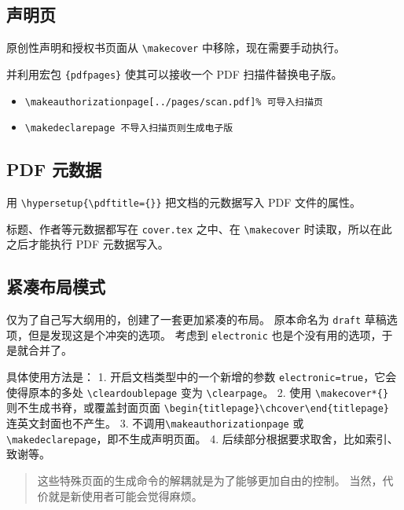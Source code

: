 \documentclass[../Main/thesis.tex]{subfiles}
\begin{document}
\subsection{声明页}

原创性声明和授权书页面从 \texttt{\textbackslash{}makecover}
中移除，现在需要手动执行。

并利用宏包 \texttt{\{pdfpages\}} 使其可以接收一个 PDF 扫描件替换电子版。

\begin{itemize}
\item
  \texttt{\textbackslash{}makeauthorizationpage{[}../pages/scan.pdf{]}\%\ 可导入扫描页}
\item
  \texttt{\textbackslash{}makedeclarepage\ 不导入扫描页则生成电子版}
\end{itemize}

\subsection{PDF 元数据}

用 \texttt{\textbackslash{}hypersetup\{\textbackslash{}pdftitle=\{\}\}}
把文档的元数据写入 PDF 文件的属性。

标题、作者等元数据都写在 \texttt{cover.tex} 之中、在
\texttt{\textbackslash{}makecover} 时读取，所以在此之后才能执行 PDF
元数据写入。

\subsection{紧凑布局模式}

仅为了自己写大纲用的，创建了一套更加紧凑的布局。 原本命名为
\texttt{draft} 草稿选项，但是发现这是个冲突的选项。 考虑到
\texttt{electronic} 也是个没有用的选项，于是就合并了。

具体使用方法是： 1. 开启文档类型中的一个新增的参数
\texttt{electronic=true}，它会使得原本的多处
\texttt{\textbackslash{}cleardoublepage} 变为
\texttt{\textbackslash{}clearpage}。 2. 使用
\texttt{\textbackslash{}makecover*\{\}} 则不生成书脊，或覆盖封面页面
\texttt{\textbackslash{}begin\{titlepage\}\textbackslash{}chcover\textbackslash{}end\{titlepage\}}
连英文封面也不产生。 3.
不调用\texttt{\textbackslash{}makeauthorizationpage} 或
\texttt{\textbackslash{}makedeclarepage}，即不生成声明页面。 4.
后续部分根据要求取舍，比如索引、致谢等。

\begin{quote}
这些特殊页面的生成命令的解耦就是为了能够更加自由的控制。
当然，代价就是新使用者可能会觉得麻烦。
\end{quote}
\end{document}
